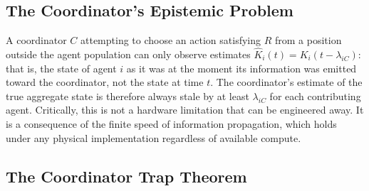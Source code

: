 \documentclass[11pt]{article}
\theoremstyle{definition}
\theoremstyle{plain}
\theoremstyle{plain}
\begin{document}
\subsection{The Coordinator's Epistemic Problem}

A coordinator $C$ attempting to choose an action satisfying $R$ from a position
outside the agent population can only observe estimates $\hat{K}_i(t) = K_i(t - \lambda_{iC})$:
that is, the state of agent $i$ as it was at the moment its information was
emitted toward the coordinator, not the state at time $t$. The coordinator's
estimate of the true aggregate state is therefore always stale by at least
$\lambda_{iC}$ for each contributing agent. Critically, this is not a hardware
limitation that can be engineered away. It is a consequence of the finite
speed of information propagation, which holds under any physical
implementation regardless of available compute.

\subsection{The Coordinator Trap Theorem}
\end{document}
